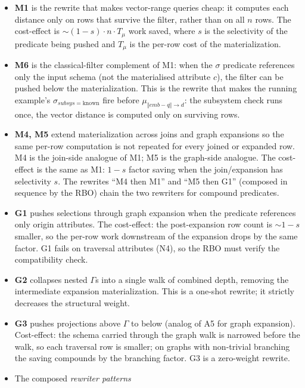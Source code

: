 \documentclass[sigconf]{acmart}
\theoremstyle{plain}
\theoremstyle{definition}
\theoremstyle{remark}
\begin{document}
\begin{itemize}[leftmargin=*, itemsep=0pt]
  \item \textbf{M1} is the rewrite that makes vector-range
    queries cheap: it computes each distance only on rows that
    survive the filter, rather than on all $n$ rows. The
    cost-effect is $\sim (1 - s) \cdot n \cdot T_\mu$ work saved,
    where $s$ is the selectivity of the predicate being pushed
    and $T_\mu$ is the per-row cost of the materialization.
  \item \textbf{M6} is the classical-filter complement of M1:
    when the $\sigma$ predicate references only the input schema
    (not the materialised attribute $c$), the filter can be
    pushed below the materialization. This is the rewrite that
    makes the running example's
    $\sigma_{\mathit{subsys}=\mathrm{known}}$ fire before
    $\mu_{\Vert\mathit{emb}-q\Vert\to d}$: the subsystem check
    runs once, the vector distance is computed only on
    surviving rows.
  \item \textbf{M4, M5} extend materialization across joins and
    graph expansions so the same per-row computation is not
    repeated for every joined or expanded row. M4 is the
    join-side analogue of M1; M5 is the graph-side analogue. The
    cost-effect is the same as M1: $1 - s$ factor saving when
    the join/expansion has selectivity $s$. The rewrites
    ``M4 then M1'' and ``M5 then G1'' (composed in sequence by
    the RBO) chain the two rewriters for compound predicates.
  \item \textbf{G1} pushes selections through graph expansion
    when the predicate references only origin attributes. The
    cost-effect: the post-expansion row count is $\sim 1 - s$
    smaller, so the per-row work downstream of the expansion
    drops by the same factor. G1 fails on traversal attributes
    (N4), so the RBO must verify the compatibility check.
  \item \textbf{G2} collapses nested $\Gamma$s into a single
    walk of combined depth, removing the intermediate expansion
    materialization. This is a one-shot rewrite; it strictly
    decreases the structural weight.
  \item \textbf{G3} pushes projections above $\Gamma$ to below
    (analog of A5 for graph expansion). Cost-effect: the
    schema carried through the graph walk is narrowed before the
    walk, so each traversal row is smaller; on graphs with
    non-trivial branching the saving compounds by the branching
    factor. G3 is a zero-weight rewrite.
  \item The composed \emph{rewriter patterns}

\end{itemize}
\end{document}
